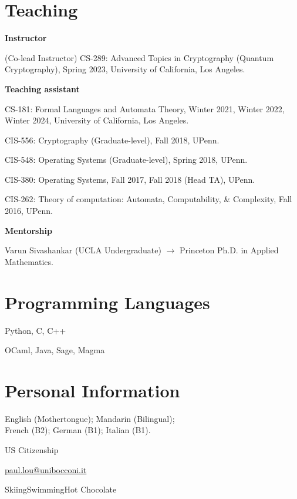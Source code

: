 \documentclass[11pt,a4paper]{article}
\begin{document}
\section{Teaching}
\textbf{Instructor}\par
{\small\raggedright\setlength{\leftskip}{9pt}
(Co-lead Instructor) CS-289: Advanced Topics in Cryptography (Quantum Cryptography), Spring 2023, University of California, Los Angeles.\par}
\vspace{3pt}
\textbf{Teaching assistant}\par
{\small\raggedright\setlength{\leftskip}{9pt}
CS-181: Formal Languages and Automata Theory, Winter 2021, Winter 2022, Winter 2024, University of California, Los Angeles.\par
CIS-556: Cryptography (Graduate-level), Fall 2018, UPenn.\par
CIS-548: Operating Systems (Graduate-level), Spring 2018, UPenn.\par
CIS-380: Operating Systems, Fall 2017, Fall 2018 (Head TA), UPenn.\par
CIS-262: Theory of computation: Automata, Computability, \& Complexity, Fall 2016, UPenn.\par}
\vspace{3pt}
\textbf{Mentorship}\par
{\small\raggedright\setlength{\leftskip}{9pt}
Varun Sivashankar (UCLA Undergraduate) $\rightarrow$ Princeton Ph.D. in Applied Mathematics.\par}

\section{Programming Languages}
\begin{details}
\item[Preferred] Python, C, C++
\item[Experienced] OCaml, Java, Sage, Magma
\end{details}

\enlargethispage{6pt}
\section{Personal Information}
\begin{details}[itemsep=1.5pt]
\item[Languages] English (Mothertongue); Mandarin (Bilingual);\\French (B2); German (B1); Italian (B1).
\item[Nationality] US Citizenship
\item[Email] \href{mailto:paul.lou@unibocconi.it}{paul.lou@unibocconi.it}
\item[Misc. Interests] Skiing\enspace\textperiodcentered\enspace Swimming\enspace\textperiodcentered\enspace Hot Chocolate
\end{details}
\end{document}
